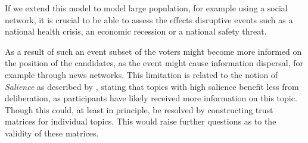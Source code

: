 If we extend this model to model large population, for example using a social
network, it is crucial to be able to assess the effects disruptive events such
as a national health crisis, an economic recession or a national safety threat.

As a result of such an event subset of the voters might become more informed on the position of
the candidates, as the event might cause information dispersal, for example
through news networks. This limitation is related to the notion of
\textit{Salience} as described by
\citet{listDeliberationSinglePeakednessPossibility2013}, stating that topics
with high salience benefit less from deliberation, as participants have likely
received more information on this topic. Though this could, at least in
principle, be resolved by constructing trust matrices for individual topics.
This would raise further questions as to the validity of these matrices.
